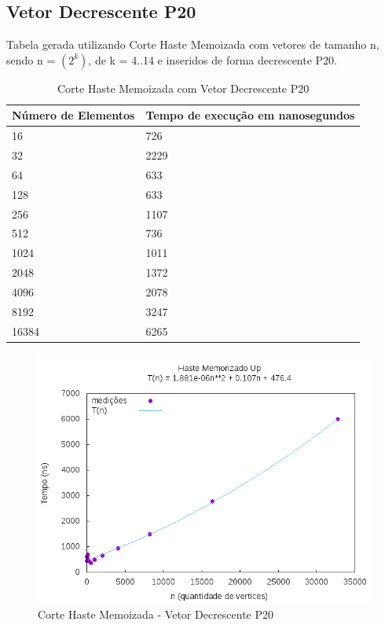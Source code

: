 \documentclass[12pt,a4paper,twoside]{report}
\begin{document}
\subsection{Vetor Decrescente P20}
Tabela gerada utilizando Corte Haste Memoizada com vetores de tamanho n, sendo n = $(2^k)$, de k = 4..14 e inseridos de forma decrescente P20.
\begin{table}[H]
\centering
\caption{Corte Haste Memoizada com Vetor Decrescente P20}
\label{my-label}
\begin{tabular}{|l|l|}
\hline
\multicolumn{1}{|c|}{\textbf{Número de Elementos}} & \multicolumn{1}{c|}{\textbf{Tempo de execução em nanosegundos}} \\ \hline
16 & 726 \\ \hline
32 & 2229 \\ \hline
64 & 633 \\ \hline
128 & 633 \\ \hline
256 & 1107 \\ \hline
512 & 736 \\ \hline
1024 & 1011 \\ \hline
2048 & 1372 \\ \hline
4096 & 2078 \\ \hline
8192 & 3247 \\ \hline
16384 & 6265 \\ \hline

\end{tabular}
\end{table}

\begin{figure}[H]
    \centering
    \includegraphics[width=0.7\linewidth]{graficos/CorteHasteMemorizado/DecrescenteP20/HasteMemo.png}
  \caption{Corte Haste Memoizada - Vetor Decrescente P20}
\end{figure}
\end{document}
